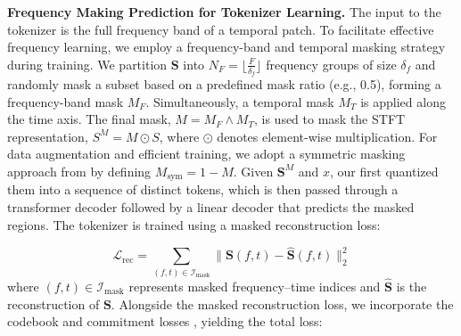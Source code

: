 \noindent\textbf{Frequency Making Prediction for Tokenizer Learning. }
The input to the tokenizer is the full frequency band of a temporal patch. 
To facilitate effective frequency learning, we employ a frequency-band and temporal masking strategy during \tokenizer training.
We partition $\mathbf{S}$ into $N_F = \lfloor\frac{F}{\delta_f}\rfloor$ frequency groups of size $\delta_f$ and randomly mask a subset based on a predefined mask ratio (e.g., 0.5), forming a frequency-band mask $M_F$. Simultaneously, a temporal mask $M_T$ is applied along the time axis. The final mask, $M = M_F \land M_T$, is used to mask the STFT representation, $S^M = M \odot S$, where $\odot$ denotes element-wise multiplication. 
For data augmentation and efficient training, we adopt a symmetric masking approach from \cite{jiang2024large} by defining $M_{\text{sym}} = 1-M$. 
Given $\mathbf{S}^M$ and $x$, our \tokenizer first quantized them into a sequence of distinct tokens, which is then passed through a transformer decoder followed by a linear decoder that predicts the masked regions. The tokenizer is trained using a masked reconstruction loss:

$$
\mathcal{L}_{\mathrm{rec}}=
\sum_{(f,t)\in\mathcal{I}_{\mathrm{mask}}}
\!\bigl\|\mathbf{S}(f,t)-\hat{\mathbf{S}}(f,t)\bigr\|_2^2
$$
where $(f,t)\in\mathcal{I}_{\text{mask}}$ represents masked frequency--time indices and $\hat{\mathbf{S}}$ is the reconstruction of $\mathbf{S}$. Alongside the masked reconstruction loss, we incorporate the codebook and commitment losses \cite{van2017neural}, yielding the total loss:   

